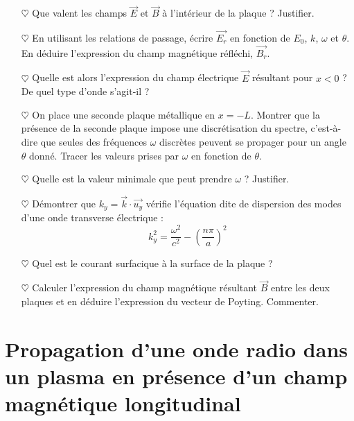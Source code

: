 \documentclass{report}
\begin{document}
\begin{itemize}
	
	\item[$\heartsuit$] Que valent les champs $\vec{E}$ et $\vec{B}$ à l'intérieur de la plaque ? Justifier.
	
	\item[$\heartsuit$] En utilisant les relations de passage, écrire $\vec{E_r}$ en fonction de $E_0$, $k$, $\omega$ et $\theta$. En déduire l'expression du champ magnétique réfléchi, $\vec{B_r}$.
	
	\item[$\heartsuit$] Quelle est alors l'expression du champ électrique $\vec{E}$ résultant pour $x<0$ ? De quel type d'onde s'agit-il ?
	
	\item[$\heartsuit$] 	On place une seconde plaque métallique en $x=-L$. Montrer que la présence de la seconde plaque impose une discrétisation du spectre, c'est-à-dire que seules des fréquences $\omega$ discrètes peuvent se propager pour un angle $\theta$ donné. Tracer les valeurs prises par $\omega$ en fonction de $\theta$. 
	\item[$\heartsuit$] Quelle est la valeur minimale que peut prendre $\omega$ ? Justifier. 
	
	\item[$\heartsuit$] Démontrer que $k_y=\vec{k}\cdot\vec{u_y}$ vérifie l'équation dite de dispersion des modes d'une onde transverse électrique : 
	\begin{equation}
		k_y^2=\frac{\omega^2}{c^2}-\left(\frac{n\pi}{a} \right)^2 
	\end{equation}
	
	\item[$\heartsuit$] Quel est le courant surfacique à la surface de la plaque ?
	
	\item[$\heartsuit$] Calculer l'expression du champ magnétique résultant $\vec{B}$ entre les deux plaques et en déduire l'expression du vecteur de Poyting. Commenter. 
	
\end{itemize}

\newpage

\section*{Propagation d'une onde radio dans un plasma en présence d'un champ magnétique longitudinal}
\end{document}
